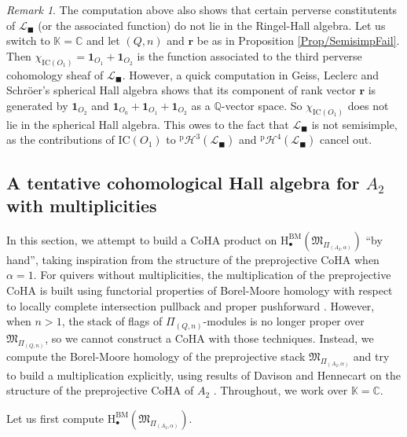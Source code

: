\documentclass[11pt,english]{article}
\numberwithin{equation}{section}
\numberwithin{figure}{section}
\theoremstyle{definition}
\theoremstyle{plain}
\theoremstyle{remark}
\newtheorem{rmk}[df]{Remark}
\newcommand\rr{\mathbf{r}}
\newcommand\HH{\mathrm{H}}
\newcommand\QQ{\mathbb{Q}}
\newcommand\KK{\mathbb{K}}
\newcommand\CC{\mathbb{C}}
\begin{document}
\begin{rmk}

The computation above also shows that certain perverse constitutents
of $\mathcal{L}_{\blacksquare}$ (or the associated function) do not
lie in the Ringel-Hall algebra. Let us switch to $\KK=\CC$ and let
$(Q,n)$ and $\rr$ be as in Proposition \ref{Prop/SemisimpFail}.
Then $\chi_{\mathrm{IC}(O_{1})}=\mathbf{1}_{O_{1}}+\mathbf{1}_{O_{2}}$
is the function associated to the third perverse cohomology sheaf
of $\mathcal{L}_{\blacksquare}$. However, a quick computation in
Geiss, Leclerc and Schröer's spherical Hall algebra \cite{GLS16}
shows that its component of rank vector $\rr$ is generated by $\mathbf{1}_{O_{2}}$
and $\mathbf{1}_{O_{0}}+\mathbf{1}_{O_{1}}+\mathbf{1}_{O_{2}}$ as
a $\QQ$-vector space. So $\chi_{\mathrm{IC}(O_{1})}$ does not lie
in the spherical Hall algebra. This owes to the fact that $\mathcal{L}_{\blacksquare}$
is not semisimple, as the contributions of $\mathrm{IC}(O_{1})$ to
$^{\mathrm{p}}\mathcal{H}^{3}(\mathcal{L}_{\blacksquare})$ and $^{\mathrm{p}}\mathcal{H}^{4}(\mathcal{L}_{\blacksquare})$
cancel out.

\end{rmk}

\subsection{A tentative cohomological Hall algebra for $A_{2}$ with multiplicities}

In this section, we attempt to build a CoHA product on $\HH_{\bullet}^{\mathrm{BM}}\left(\mathfrak{M}_{\Pi_{(A_{2},\alpha)}}\right)$
``by hand'', taking inspiration from the structure of the preprojective
CoHA when $\alpha=1$. For quivers without multiplicities, the multiplication
of the preprojective CoHA is built using functorial properties of
Borel-Moore homology with respect to locally complete intersection
pullback and proper pushforward \cite{SV13b,YZ18a}. However, when
$n>1$, the stack of flags of $\Pi_{(Q,n)}$-modules is no longer
proper over $\mathfrak{M}_{\Pi_{(Q,n)}}$, so we cannot construct
a CoHA with those techniques. Instead, we compute the Borel-Moore
homology of the preprojective stack $\mathfrak{M}_{\Pi_{(A_{2},\alpha)}}$
and try to build a multiplication explicitly, using results of Davison
and Hennecart on the structure of the preprojective CoHA of $A_{2}$
\cite{Dav22,Hen24}. Throughout, we work over $\KK=\CC$.

Let us first compute $\HH_{\bullet}^{\mathrm{BM}}\left(\mathfrak{M}_{\Pi_{(A_{2},\alpha)}}\right)$.
\end{document}

